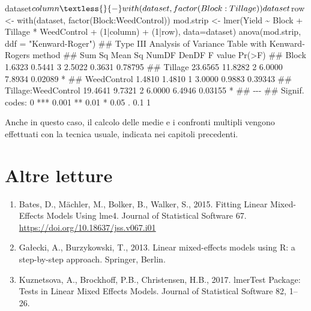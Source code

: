 \documentclass[a4paper,12pt,oneside]{book}
\providecommand{\tightlist}{%
  \setlength{\itemsep}{0pt}\setlength{\parskip}{0pt}}
\newenvironment{Shaded}{\begin{snugshade}}{\end{snugshade}}
\newcommand{\DecValTok}[1]{#1}
\newcommand{\SpecialCharTok}[1]{#1}
\newcommand{\StringTok}[1]{#1}
\newcommand{\DocumentationTok}[1]{#1}
\newcommand{\OtherTok}[1]{#1}
\newcommand{\FunctionTok}[1]{#1}
\newcommand{\AttributeTok}[1]{#1}
\newcommand{\NormalTok}[1]{#1}
\begin{document}
\begin{Shaded}
\begin{Highlighting}[]
\NormalTok{dataset}\SpecialCharTok{$}\NormalTok{column }\OtherTok{\textless{}{-}} \FunctionTok{with}\NormalTok{(dataset, }\FunctionTok{factor}\NormalTok{(Block}\SpecialCharTok{:}\NormalTok{Tillage))}
\NormalTok{dataset}\SpecialCharTok{$}\NormalTok{row }\OtherTok{\textless{}{-}} \FunctionTok{with}\NormalTok{(dataset, }\FunctionTok{factor}\NormalTok{(Block}\SpecialCharTok{:}\NormalTok{WeedControl))}
\NormalTok{mod.strip }\OtherTok{\textless{}{-}} \FunctionTok{lmer}\NormalTok{(Yield }\SpecialCharTok{\textasciitilde{}}\NormalTok{ Block }\SpecialCharTok{+}\NormalTok{ Tillage }\SpecialCharTok{*}\NormalTok{ WeedControl }\SpecialCharTok{+}
\NormalTok{                  (}\DecValTok{1}\SpecialCharTok{|}\NormalTok{column) }\SpecialCharTok{+}\NormalTok{ (}\DecValTok{1}\SpecialCharTok{|}\NormalTok{row), }\AttributeTok{data=}\NormalTok{dataset)}
\FunctionTok{anova}\NormalTok{(mod.strip, }\AttributeTok{ddf =} \StringTok{"Kenward{-}Roger"}\NormalTok{)}
\DocumentationTok{\#\# Type III Analysis of Variance Table with Kenward{-}Roger\textquotesingle{}s method}
\DocumentationTok{\#\#                      Sum Sq Mean Sq NumDF  DenDF F value  Pr(\textgreater{}F)  }
\DocumentationTok{\#\# Block                1.6323  0.5441     3 2.5022  0.3631 0.78795  }
\DocumentationTok{\#\# Tillage             23.6565 11.8282     2 6.0000  7.8934 0.02089 *}
\DocumentationTok{\#\# WeedControl          1.4810  1.4810     1 3.0000  0.9883 0.39343  }
\DocumentationTok{\#\# Tillage:WeedControl 19.4641  9.7321     2 6.0000  6.4946 0.03155 *}
\DocumentationTok{\#\# {-}{-}{-}}
\DocumentationTok{\#\# Signif. codes:  0 \textquotesingle{}***\textquotesingle{} 0.001 \textquotesingle{}**\textquotesingle{} 0.01 \textquotesingle{}*\textquotesingle{} 0.05 \textquotesingle{}.\textquotesingle{} 0.1 \textquotesingle{} \textquotesingle{} 1}
\end{Highlighting}
\end{Shaded}

Anche in questo caso, il calcolo delle medie e i confronti multipli vengono effettuati con la tecnica usuale, indicata nei capitoli precedenti.

\hypertarget{altre-letture-10}{%
\section{Altre letture}\label{altre-letture-10}}

\begin{enumerate}
\def\labelenumi{\arabic{enumi}.}
\tightlist
\item
  Bates, D., Mächler, M., Bolker, B., Walker, S., 2015. Fitting Linear Mixed-Effects Models Using lme4. Journal of Statistical Software 67. \url{https://doi.org/10.18637/jss.v067.i01}
\item
  Gałecki, A., Burzykowski, T., 2013. Linear mixed-effects models using R: a step-by-step approach. Springer, Berlin.
\item
  Kuznetsova, A., Brockhoff, P.B., Christensen, H.B., 2017. lmerTest Package: Tests in Linear Mixed Effects Models. Journal of Statistical Software 82, 1--26.
\end{enumerate}
\end{document}
